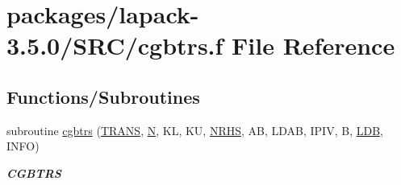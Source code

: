 \hypertarget{cgbtrs_8f}{}\section{packages/lapack-\/3.5.0/\+S\+R\+C/cgbtrs.f File Reference}
\label{cgbtrs_8f}
\subsection*{Functions/\+Subroutines}
\begin{DoxyCompactItemize}
\item 
subroutine \hyperlink{group__complexGBcomputational_ga72b02720b9ad928960ee5a5e92e6a5d7}{cgbtrs} (\hyperlink{superlu__enum__consts_8h_a0c4e17b2d5cea33f9991ccc6a6678d62a1f61e3015bfe0f0c2c3fda4c5a0cdf58}{T\+R\+A\+N\+S}, \hyperlink{polmisc_8c_a0240ac851181b84ac374872dc5434ee4}{N}, K\+L, K\+U, \hyperlink{example__user_8c_aa0138da002ce2a90360df2f521eb3198}{N\+R\+H\+S}, A\+B, L\+D\+A\+B, I\+P\+I\+V, B, \hyperlink{example__user_8c_a50e90a7104df172b5a89a06c47fcca04}{L\+D\+B}, I\+N\+F\+O)
\begin{DoxyCompactList}\small\item\em {\bfseries C\+G\+B\+T\+R\+S} \end{DoxyCompactList}\end{DoxyCompactItemize}
